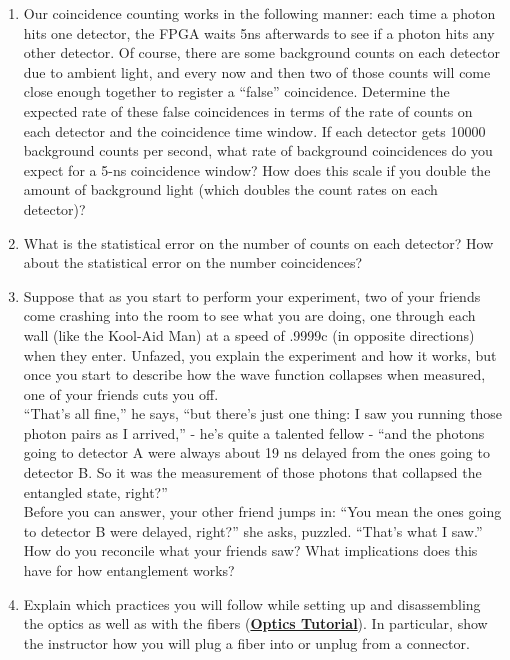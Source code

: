 \documentclass{../signatures}
\begin{document}
\begin{enumerate}
    \item Our coincidence counting works in the following manner: each time a photon hits one detector, the FPGA waits 5ns afterwards to see if a photon hits any other detector. Of course, there are some background counts on each detector due to ambient light, and every now and then two of those counts will come close enough together to register a ``false'' coincidence. Determine the expected rate of these false coincidences in terms of the rate of counts on each detector and the coincidence time window. If each detector gets 10000 background counts per second, what rate of background coincidences do you expect for a 5-ns coincidence window? How does this scale if you double the amount of background light (which doubles the count rates on each detector)?

    \item What is the statistical error on the number of counts on each detector? How about the statistical error on the number coincidences?

    \item Suppose that as you start to perform your experiment, two of your friends come crashing into the room to see what you are doing, one through each wall (like the Kool-Aid Man) at a speed of .9999c (in opposite directions) when they enter. Unfazed, you explain the experiment and how it works, but once you start to describe how the wave function collapses when measured, one of your friends cuts you off.
    \\``That's all fine,'' he says, ``but there's just one thing: I saw you running those photon pairs as I arrived,'' - he's quite a talented fellow - ``and the photons going to detector A were always about 19 ns delayed from the ones going to detector B. So it was the measurement of those photons that collapsed the entangled state, right?''\\
    Before you can answer, your other friend jumps in: ``You mean the ones going to detector B were delayed, right?'' she asks, puzzled. ``That's what I saw.''\\
    How do you reconcile what your friends saw? What implications does this have for how entanglement works?

    \item Explain which practices you will follow while setting up and disassembling the optics as well as with the fibers (\href{http://experimentationlab.berkeley.edu/OpticsTutorial}{\textbf{Optics Tutorial}}). In particular, show the instructor how you will plug a fiber into or unplug from a connector.
    \\[32pt]
\end{enumerate}
\end{document}
